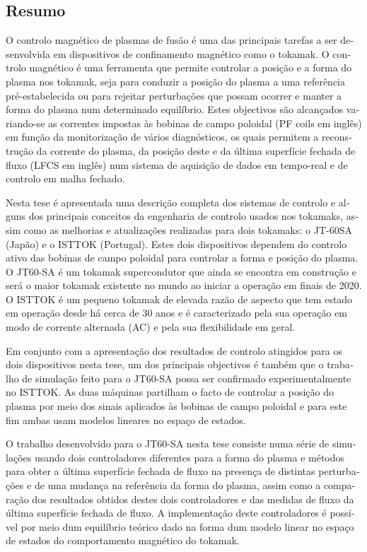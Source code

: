 \pagebreak
\begin{otherlanguage}{portuguese}
\chapter*{Resumo}

O  controlo magnético de plasmas de fusão é uma das principais tarefas a ser desenvolvida em dispositivos de confinamento magnético como o tokamak. O controlo magnético é uma ferramenta que permite controlar a posição e a forma do plasma nos tokamak, seja para conduzir a posição do plasma a uma referência pré-estabelecida ou para rejeitar perturbações que possam ocorrer e manter a forma do plasma num determinado equilíbrio. Estes objectivos são alcançados variando-se as correntes impostas às bobinas de campo poloidal (PF coils em inglês)  em função da monitorização de vários diagnósticos, os quais permitem a reconstrução da corrente do plasma, da posição deste e da última superfície fechada de fluxo (LFCS em inglês) num sistema de aquisição de dados em tempo-real e de controlo em malha fechado. \smallskip

Nesta tese é apresentada uma descrição completa dos sistemas de controlo e alguns dos principais conceitos da engenharia de controlo usados nos tokamaks, assim como as melhorias e atualizações realizadas para dois tokamaks: o JT-60SA (Japão) e o ISTTOK (Portugal). Estes dois dispositivos dependem do controlo ativo das bobinas de campo poloidal para controlar a forma e posição do plasma. O JT60-SA é um tokamak supercondutor que ainda se encontra em construção e será o maior tokamak existente no mundo ao iniciar a operação em finais de 2020. O ISTTOK é um pequeno tokamak de elevada razão de aspecto que tem estado em operação desde há cerca de 30 anos e é caracterizado pela sua operação em modo de corrente alternada (AC) e pela sua flexibilidade em geral.\smallskip

Em conjunto com a apresentação dos resultados de controlo atingidos para os dois dispositivos nesta tese, um dos principais objectivos é também que o trabalho de simulação feito para o JT60-SA possa ser confirmado experimentalmente no ISTTOK. As duas máquinas partilham o facto de controlar a posição do plasma por meio dos sinais aplicados às bobinas de campo poloidal e para este fim ambas usam modelos lineares no espaço de estados.  \smallskip

O trabalho desenvolvido para o JT60-SA nesta tese consiste numa série de simulações usando dois controladores diferentes para a forma do plasma e métodos para obter a última superfície fechada de fluxo na presença de distintas perturbações e de uma mudança na referência da forma do plasma, assim como a comparação dos resultados obtidos destes dois controladores e  das medidas de fluxo da última superfície fechada de fluxo. A implementação deste controladores é  possível por meio dum equilíbrio teórico dado na forma dum modelo linear no espaço de estados do comportamento magnético do tokamak.\smallskip


\end{otherlanguage}
